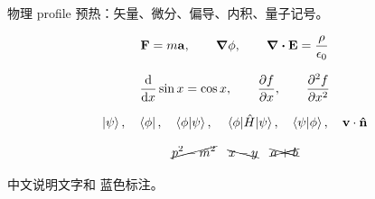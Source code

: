 


\begin{preview}

物理 profile 预热：矢量、微分、偏导、内积、量子记号。

\[
  \vb{F}=m\vb{a},\qquad
  \grad \phi,\qquad
  \div \vb{E}=\frac{\rho}{\epsilon_0}
\]

\[
  \dv{x}\sin x=\cos x,\qquad
  \pdv{f}{x},\qquad
  \pdv[2]{f}{x}
\]

\[
  \ket{\psi},\quad \bra{\phi},\quad \braket{\phi}{\psi},\quad
  \mel{\phi}{\hat{H}}{\psi},\quad \ip{\psi}{\phi},\quad \vb{v}\cdot\vu{n}
\]

\[
  \cancel{p^2-m^2}\quad \bcancel{x-y}\quad \xcancel{a+b}
\]

中文说明文字和 {\color{blue}蓝色标注}。

\end{preview}

